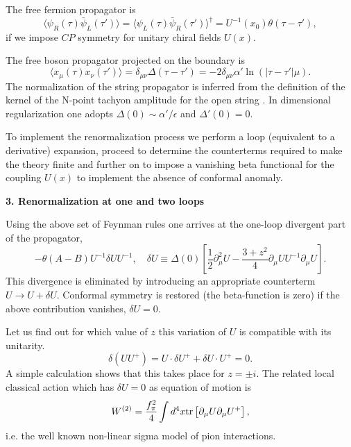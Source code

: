 \documentclass[a4paper,12pt]{article}
\begin{document}
The free fermion propagator is
\begin{equation}
\langle\psi_R (\tau) \bar\psi_L(\tau')\rangle =
\langle\psi_L (\tau) \bar\psi_R(\tau')\rangle^\dagger = U^{-1} (x_0) 
\theta(\tau - \tau'),
\end{equation}
if we impose $CP$ symmetry for unitary chiral fields $U(x)$.

The free boson propagator projected on the boundary is
\begin{equation}
\langle x_\mu(\tau) x_\nu(\tau')\rangle = \delta_{\mu\nu}
\Delta (\tau -\tau') =- 2 \delta_{\mu\nu} \alpha'\ln(|\tau 
-\tau'|\mu).
\end{equation}
The normalization of the string propagator is inferred \cite{aabe} from 
the  
definition of the kernel of the N-point tachyon amplitude for the 
open string \cite{Rebbi}. In dimensional regularization one adopts
$\Delta (0) \sim
\alpha'/\epsilon$ and  $\Delta'(0) = 0$. 

To implement the
renormalization process we perform a loop (equivalent to a
derivative) expansion, proceed to determine the counterterms required
to make the theory finite and further on to impose a vanishing
beta functional for the coupling $U(x)$ to implement
the absence of conformal anomaly.\\

\centerline{\large\bf 3. Renormalization at one and two loops}

\medskip

Using the above set of Feynman rules one
arrives at the one-loop divergent part of the propagator,
\begin{equation}
- \theta(A - B) U^{-1} \delta U U^{-1},\quad \delta U \equiv \Delta(0) 
\left[\frac12 \partial^2_{\mu} U -
\frac{3 + z^2}{4}\partial_\mu U U^{-1}\partial_\mu U\right] .\label{1div}
\end{equation}
This divergence is eliminated by introducing 
an appropriate counterterm $U \to U+\delta U$.
Conformal symmetry is restored (the beta-function is zero) if
the above contribution vanishes, $\delta U = 0$.

Let us find out for which value of $z$ this variation of $U$ is 
compatible with 
its unitarity.
\begin{equation}
\delta (U U^+)= U \cdot\delta U^+ + \delta U\cdot U^+ = 0. \label{unit}
\end{equation}
A simple calculation shows that this
takes place for $z = \pm i$. 
The related local classical action which 
has $\delta U = 0$ as equation of motion is
\begin{equation}
W^{(2)} = \frac{f_\pi^2}{4}\int d^4 x \mbox{\rm tr}\left[\partial_\mu U
\partial_\mu U^+ \right], \label{weinb}
\end{equation}
i.e. the well known non-linear 
sigma model of  pion interactions.
\end{document}
